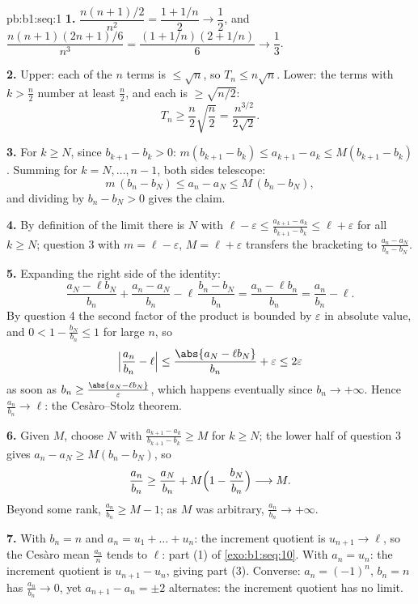 \begin{solution}{pb:b1:seq:1}
\textbf{1.} $\dfrac{n(n+1)/2}{n^2} = \dfrac{1 + 1/n}{2} \to
\dfrac12$, and $\dfrac{n(n+1)(2n+1)/6}{n^3} = \dfrac{(1 +
1/n)(2 + 1/n)}{6} \to \dfrac13$.

\textbf{2.} Upper: each of the $n$ terms is $\leq \sqrt n$, so
$T_n \leq n\sqrt n$. Lower: the terms with $k > \frac n2$ number
at least $\frac n2$, and each is $\geq \sqrt{n/2}$:
\[
T_n \geq \frac n2 \sqrt{\frac n2} = \frac{n^{3/2}}{2\sqrt 2} .
\]

\textbf{3.} For $k \geq N$, since $b_{k+1} - b_k > 0$:
$m(b_{k+1} - b_k) \leq a_{k+1} - a_k \leq M(b_{k+1} - b_k)$.
Summing for $k = N, \dots, n - 1$, both sides telescope:
\[
m\,(b_n - b_N) \leq a_n - a_N \leq M\,(b_n - b_N),
\]
and dividing by $b_n - b_N > 0$ gives the claim.

\textbf{4.} By definition of the limit there is $N$ with $\ell -
\varepsilon \leq \frac{a_{k+1} - a_k}{b_{k+1} - b_k} \leq \ell +
\varepsilon$ for all $k \geq N$; question 3 with $m = \ell -
\varepsilon$, $M = \ell + \varepsilon$ transfers the bracketing
to $\frac{a_n - a_N}{b_n - b_N}$.

\textbf{5.} Expanding the right side of the identity:
\[
\frac{a_N - \ell b_N}{b_n} + \frac{a_n - a_N}{b_n} -
\ell\,\frac{b_n - b_N}{b_n}
= \frac{a_n - \ell b_n}{b_n} = \frac{a_n}{b_n} - \ell .
\]
By question 4 the second factor of the product is bounded by
$\varepsilon$ in absolute value, and $0 < 1 - \frac{b_N}{b_n}
\leq 1$ for large $n$, so
\[
\Bigl|\frac{a_n}{b_n} - \ell\Bigr|
\leq \frac{\abs{a_N - \ell b_N}}{b_n} + \varepsilon
\leq 2\varepsilon
\]
as soon as $b_n \geq \frac{\abs{a_N - \ell b_N}}{\varepsilon}$,
which happens eventually since $b_n \to +\infty$. Hence
$\frac{a_n}{b_n} \to \ell$: the Ces\`aro--Stolz theorem.

\textbf{6.} Given $M$, choose $N$ with $\frac{a_{k+1} -
a_k}{b_{k+1} - b_k} \geq M$ for $k \geq N$; the lower half of
question 3 gives $a_n - a_N \geq M(b_n - b_N)$, so
\[
\frac{a_n}{b_n} \geq \frac{a_N}{b_n} +
M\Bigl(1 - \frac{b_N}{b_n}\Bigr) \longrightarrow M .
\]
Beyond some rank, $\frac{a_n}{b_n} \geq M - 1$; as $M$ was
arbitrary, $\frac{a_n}{b_n} \to +\infty$.

\textbf{7.} With $b_n = n$ and $a_n = u_1 + \dots + u_n$: the
increment quotient is $u_{n+1} \to \ell$, so the Ces\`aro mean
$\frac{a_n}{n}$ tends to $\ell$: part (1) of
\cref{exo:b1:seq:10}. With $a_n = u_n$: the increment quotient
is $u_{n+1} - u_n$, giving part (3). Converse: $a_n = (-1)^n$,
$b_n = n$ has $\frac{a_n}{b_n} \to 0$, yet $a_{n+1} - a_n = \pm
2$ alternates: the increment quotient has no limit.


\end{solution}
